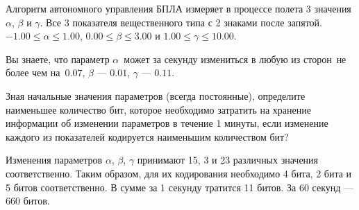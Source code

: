 
Алгоритм автономного управления БПЛА измеряет в процессе полета 3 значения $\alpha$, $\beta$ и $\gamma$. Все 3 показателя вещественного типа с 2 знаками после запятой. $-1.00\leq \alpha\leq 1.00$, $0.00\leq\beta\leq 3.00$ и $1.00\leq\gamma\leq10.00$.

Вы знаете, что параметр $\alpha$ может за секунду измениться в любую из сторон не более чем на $0.07$, $\beta$ — $0.01$, $\gamma$ — $0.11$.

Зная начальные значения параметров (всегда постоянные), определите наименьшее количество бит, которое необходимо затратить на хранение информации об изменении параметров в течение 1 минуты, если изменение каждого из показателей кодируется наименьшим количеством бит?

\solutionSection

Изменения параметров $\alpha$, $\beta$, $\gamma$ принимают 15, 3 и 23 различных значения соответственно. Таким образом, для их кодирования необходимо 4 бита, 2 бита и 5 битов соответственно. В сумме за 1 секунду тратится 11 битов. За 60 секунд — 660 битов. 


